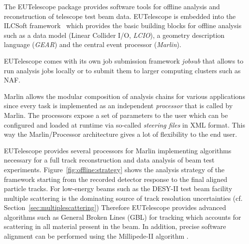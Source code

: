 

The EUTelescope package \cite{ref:eutelwebsite} provides software tools for offline analysis and reconstruction of telescope test beam data. 
EUTelescope is embedded into the ILCSoft framework~\cite{ref:eudetmemo_2009_12} which provides the basic building blocks for offline analysis such as a data model (Linear Collider I/O, \emph{LCIO}),
a geometry description language (\emph{GEAR}) and the central event processor (\emph{Marlin}).


EUTelescope comes with its own job submission framework \emph{jobsub} that allows to run analysis jobs locally or to submit them to larger computing clusters such as NAF.

Marlin allows the modular composition of analysis chains for various applications since every task is implemented as an independent \emph{processor} that is called by Marlin. 
The processors expose a set of parameters to the user which can be configured and loaded at runtime via so-called \emph{steering files} in XML format.
This way the Marlin/Processor architecture gives a lot of flexibility to the end user. 

EUTelescope provides several processors for Marlin implementing algorithms necessary for a full track reconstruction and data analysis of beam test experiments. 
Figure~\ref{fig:offline:strategy} shows the analysis strategy of the framework starting from the recorded detector response to the final aligned particle tracks. 
For low-energy beams such as the DESY-II test beam facility multiple scattering is the dominating source of track resolution uncertainties (cf.\,Section~\ref{sec:multiplescattering})
Therefore EUTelescope provides advanced algorithms such as General Broken Lines (GBL) \cite{Kleinwort-2012} for tracking which accounts for scattering in all material present in the beam. 
In addition, precise software alignment can be performed using the Millipede-II algorithm \cite{Blobel-2006}.

